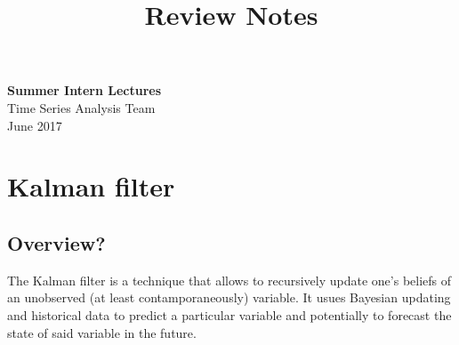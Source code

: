 \documentclass[11pt]{article}
\theoremstyle{definition}
\begin{document}
\setcounter{section}{0}
\title{Review Notes}

\thispagestyle{empty}

\begin{center}
{\LARGE \bf Summer Intern Lectures}\\
{\large Time Series Analysis Team}\\
June 2017
\end{center}
\section{Kalman filter}
\subsection{Overview?}
The Kalman filter is a technique that allows to recursively update one's beliefs of an unobserved (at least contamporaneously) variable. It usues Bayesian updating and historical data to predict a particular variable and potentially to forecast the state of said variable in the future. \newline
\end{document}
